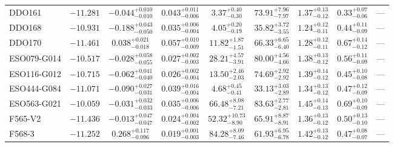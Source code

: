 \documentclass[twocolumn,tighten]{aastex63}
\begin{document}
\begin{table}
\begin{center}
\begin{tabular}{lcccccccc}
     DDO161 & $ -11.281 $ & $ -0.044 _{ -0.010 } ^{ + 0.010 } $ & $ 0.043 _{ -0.006 } ^{ + 0.011 } $ & $ 3.37 _{ -0.30 } ^{ + 0.40 } $ & $ 73.91 _{ -7.97 } ^{ + 7.96 } $ & $ 1.37 _{ -0.12 } ^{ + 0.13 } $ & $ 0.33 _{ -0.06 } ^{ + 0.07 } $ & --- \\  
     DDO168 & $ -10.931 $ & $ -0.188 _{ -0.050 } ^{ + 0.043 } $ & $ 0.035 _{ -0.004 } ^{ + 0.006 } $ & $ 4.05 _{ -0.19 } ^{ + 0.20 } $ & $ 35.82 _{ -3.55 } ^{ + 3.72 } $ & $ 1.24 _{ -0.11 } ^{ + 0.12 } $ & $ 0.44 _{ -0.09 } ^{ + 0.11 } $ & --- \\  
     DDO170 & $ -11.461 $ & $ 0.038 _{ -0.018 } ^{ + 0.021 } $ & $ 0.057 _{ -0.009 } ^{ + 0.010 } $ & $ 11.82 _{ -1.51 } ^{ + 1.87 } $ & $ 66.33 _{ -6.40 } ^{ + 6.65 } $ & $ 1.28 _{ -0.11 } ^{ + 0.12 } $ & $ 0.67 _{ -0.12 } ^{ + 0.14 } $ & --- \\  
ESO079-G014 & $ -10.517 $ & $ -0.028 _{ -0.055 } ^{ + 0.058 } $ & $ 0.027 _{ -0.003 } ^{ + 0.002 } $ & $ 28.21 _{ -3.91 } ^{ + 4.57 } $ & $ 80.00 _{ -4.66 } ^{ + 4.56 } $ & $ 1.38 _{ -0.12 } ^{ + 0.13 } $ & $ 0.56 _{ -0.09 } ^{ + 0.11 } $ & --- \\  
ESO116-G012 & $ -10.715 $ & $ -0.062 _{ -0.040 } ^{ + 0.041 } $ & $ 0.026 _{ -0.004 } ^{ + 0.002 } $ & $ 13.50 _{ -2.03 } ^{ + 2.46 } $ & $ 74.69 _{ -2.92 } ^{ + 2.92 } $ & $ 1.39 _{ -0.12 } ^{ + 0.14 } $ & $ 0.45 _{ -0.08 } ^{ + 0.10 } $ & --- \\  
ESO444-G084 & $ -11.071 $ & $ -0.090 _{ -0.031 } ^{ + 0.027 } $ & $ 0.039 _{ -0.004 } ^{ + 0.016 } $ & $ 4.68 _{ -0.41 } ^{ + 0.45 } $ & $ 33.13 _{ -2.89 } ^{ + 3.03 } $ & $ 1.34 _{ -0.12 } ^{ + 0.13 } $ & $ 0.47 _{ -0.09 } ^{ + 0.12 } $ & --- \\  
ESO563-G021 & $ -10.059 $ & $ -0.031 _{ -0.033 } ^{ + 0.032 } $ & $ 0.035 _{ -0.006 } ^{ + 0.006 } $ & $ 66.48 _{ -7.21 } ^{ + 8.08 } $ & $ 83.63 _{ -2.81 } ^{ + 2.77 } $ & $ 1.45 _{ -0.13 } ^{ + 0.14 } $ & $ 0.69 _{ -0.09 } ^{ + 0.10 } $ & --- \\  
    F565-V2 & $ -11.436 $ & $ -0.013 _{ -0.047 } ^{ + 0.047 } $ & $ 0.024 _{ -0.002 } ^{ + 0.004 } $ & $ 52.32 _{ -8.90 } ^{ + 10.73 } $ & $ 65.91 _{ -8.91 } ^{ + 8.87 } $ & $ 1.36 _{ -0.12 } ^{ + 0.13 } $ & $ 0.50 _{ -0.10 } ^{ + 0.13 } $ & --- \\  
     F568-3 & $ -11.252 $ & $ 0.268 _{ -0.096 } ^{ + 0.117 } $ & $ 0.019 _{ -0.003 } ^{ + 0.001 } $ & $ 84.28 _{ -7.46 } ^{ + 8.09 } $ & $ 61.93 _{ -6.78 } ^{ + 6.95 } $ & $ 1.42 _{ -0.12 } ^{ + 0.13 } $ & $ 0.47 _{ -0.07 } ^{ + 0.08 } $ & --- \\  

\end{tabular}
\end{center}
\end{table}
\end{document}
